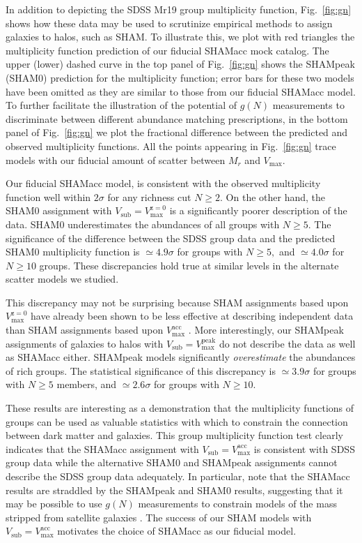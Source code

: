 \documentclass[usenatbib,usegraphicx,letterpaper]{mn2e}
\newcommand{\vpeak}{V_{\mathrm{max}}^{\mathrm{peak}}}
\newcommand{\vmax}{V_{\mathrm{max}}}
\newcommand{\vacc}{V_{\mathrm{max}}^{\mathrm{acc}}}
\newcommand{\vzero}{V_{\mathrm{max}}^{\mathrm{z=0}}}
\newcommand{\vsub}{V_{\mathrm{sub}}}
\begin{document}
In addition to depicting the SDSS Mr19 group multiplicity function, 
Fig.~\ref{fig:gn} shows how these data may be used to scrutinize 
empirical methods to assign galaxies to halos, such as SHAM. 
To illustrate this, we plot with red triangles the multiplicity 
function prediction of our fiducial SHAMacc mock catalog. The upper (lower) 
dashed curve in the top panel of Fig.~\ref{fig:gn} shows the SHAMpeak 
(SHAM0) prediction for the multiplicity function; error bars for these 
two models have been omitted as they are similar to those from our 
fiducial SHAMacc model. To further facilitate the illustration of the 
potential of $g(N)$ measurements to discriminate between different 
abundance matching prescriptions, in the bottom panel of 
Fig.~\ref{fig:gn} we plot the fractional difference between 
the predicted and observed multiplicity functions. All the points 
appearing in Fig.~\ref{fig:gn} trace models with our 
fiducial amount of scatter between $M_r$ and $\vmax.$


Our fiducial SHAMacc model, is consistent with the observed multiplicity 
function well within $2\sigma$ for any richness cut $N \geq 2$.  On the other hand, 
the SHAM0 assignment with $\vsub=\vzero$ is a significantly poorer description of the 
data.  SHAM0 underestimates the abundances of all groups with $N \geq 5$.  
The significance of the difference between the SDSS group data and the predicted 
SHAM0 multiplicity function is $\simeq 4.9\sigma$ for groups with $N\geq5,$ 
and $\simeq 4.0\sigma$ for $N \geq 10$ groups. 
These discrepancies hold true at similar levels in the alternate 
scatter models we studied. 


This discrepancy may not be surprising 
because SHAM assignments based upon $\vzero$ have 
already been shown to be less effective at describing independent 
data than SHAM assignments based upon $\vacc$ 
\cite[e.g.][]{conroy_etal06,berrier_etal11,watson_etal11,reddick_etal12}.  
More interestingly, our SHAMpeak assignments of galaxies to halos with $\vsub=\vpeak$ 
do not describe the data as well as SHAMacc either.  
SHAMpeak models significantly {\em overestimate} the abundances of rich groups. 
The statistical significance of this discrepancy is $\simeq 3.9\sigma$ 
for groups with $N \geq 5$ members, and $\simeq 2.6\sigma$ for groups with $N \geq 10$.   


These results are interesting as a demonstration that the multiplicity functions 
of groups can be used as valuable statistics with which to constrain the connection 
between dark matter and galaxies. This group multiplicity function test clearly 
indicates that the SHAMacc assignment with $\vsub=\vacc$ is consistent with SDSS 
group data while the alternative SHAM0 and SHAMpeak assignments cannot describe 
the SDSS group data adequately.  In particular, note that the SHAMacc results are 
straddled by the SHAMpeak and SHAM0 results, suggesting that it may be possible 
to use $g(N)$ measurements to constrain models of the mass stripped from satellite 
galaxies \cite[e.g.][]{watson_etal11}. The success of our SHAM models with $\vsub=\vacc$ 
motivates the choice of SHAMacc as our fiducial model.  
\end{document}
